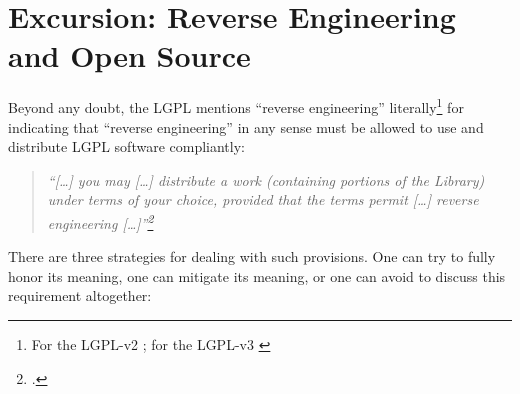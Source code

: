 %
%
%
%
%



\section{Excursion: Reverse Engineering and Open Source}

Beyond any doubt, the LGPL mentions \enquote{reverse engineering}
literally\footnote{For the LGPL-v2 \cite[cf.][\nopage wp.
§6]{Lgpl21OsiLicense1999a}; for the LGPL-v3 \cite[cf.][\nopage wp.
§4]{Lgpl30OsiLicense2007a} } for indicating that \enquote{reverse engineering}
in any sense must be allowed to use and distribute LGPL software compliantly:

\begin{quote}\noindent\emph{\enquote{[\ldots] you may [\ldots] distribute a
work (containing portions of the Library) under terms of your choice, provided
that the terms permit [\ldots] \emph{reverse engineering}
[\ldots]}\footcite[cf.][\nopage wp, §6]{Lgpl21OsiLicense1999a}}
\end{quote}

There are three strategies for dealing with such provisions. One can try to
fully honor its meaning, one can mitigate its meaning, or one can avoid to
discuss this requirement altogether:

